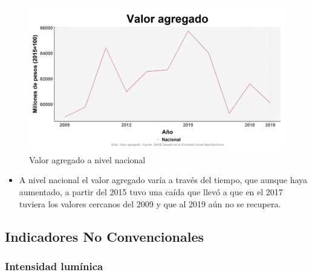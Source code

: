     \begin{figure}[H]
        \caption{Valor agregado a nivel nacional \label{map_result_2} }
        \begin{center}
        \includegraphics[width=\textwidth,keepaspectratio]{img/var_227_trend.png}
        \end{center}
    \end{figure}
            \begin{itemize}
                    \item A nivel nacional el valor agregado varía a través del tiempo, que aunque haya aumentado, a partir del 2015 tuvo una caída que llevó a que en el 2017 tuviera los valores cercanos del 2009 y que al 2019 aún no se recupera.
                    \end{itemize}

    \subsection{Indicadores No Convencionales}
        \subsubsection{Intensidad lumínica}


